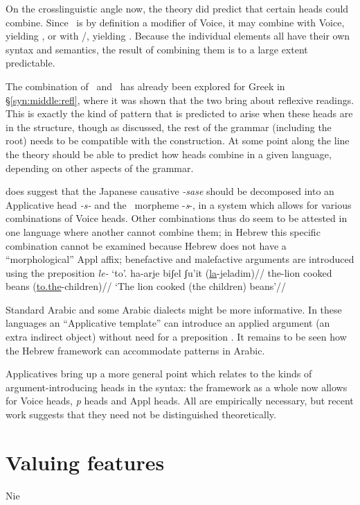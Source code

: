 On the crosslinguistic angle now, the theory did predict that certain heads could combine. Since \va~is by definition a modifier of Voice, it may combine with Voice, yielding \tpie, or with \vz/\pz, yielding \thit. Because the individual elements all have their own syntax and semantics, the result of combining them is to a large extent predictable.

The combination of \vz~and \va~has already been explored for Greek in \S\ref{syn:middle:refl}, where it was shown that the two bring about reflexive readings. This is exactly the kind of pattern that is predicted to arise when these heads are in the structure, though as discussed, the rest of the grammar (including the root) needs to be compatible with the construction. At some point along the line the theory should be able to predict how heads combine in a given language, depending on other aspects of the grammar.

\cite{oseki16nyu} does suggest that the Japanese causative \emph{-sase} should be decomposed into an Applicative head \emph{-s-} and the \vd~morpheme -\emph{s}-{, in a system which allows for various combinations of Voice heads}. Other combinations thus do seem to be attested in one language where another cannot combine them; in Hebrew this {specific }combination cannot be examined because Hebrew does not have a ``morphological'' Appl affix; benefactive and malefactive arguments are introduced using the preposition \emph{le-} `to'.
\ex \begingl
    \gla ha-arje biʃel ʃu'it (\underline{la}-jeladim)//
    \glb the-lion cooked beans (\underline{to.the}-children)//
    \glft `The lion cooked (the children) beans'//
    \endgl
\xe

Standard Arabic and some Arabic dialects might be more informative. In these languages an ``Applicative template'' can introduce an applied argument (an extra indirect object) without need for a preposition \citep{alkaabi12}. It remains to be seen how the Hebrew framework can accommodate patterns in Arabic.

Applicatives bring up a more general point which relates to the kinds of argument-introducing heads in the syntax: the framework as a whole now allows for Voice heads, \emph{p} heads and Appl heads. All are empirically necessary, but recent work suggests that they need not be distinguished theoretically.

\section{Valuing features}
Nie



